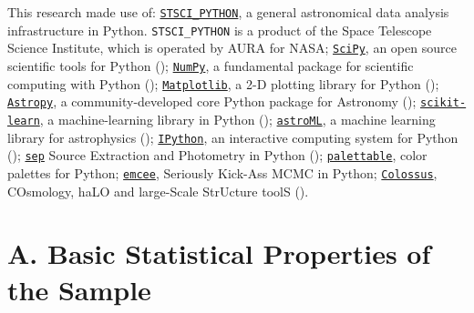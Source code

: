 \documentclass{emulateapj}
\begin{document}
\begin{CJK*}{UTF8}{gbsn}
  This research made use of:
  \href{http://www.stsci.edu/institute/software_hardware/pyraf/stsci\_python}{\texttt{STSCI\_PYTHON}},
      a general astronomical data analysis infrastructure in Python. 
      \texttt{STSCI\_PYTHON} is a product of the Space Telescope Science Institute, 
      which is operated by AURA for NASA;
  \href{http://www.scipy.org/}{\texttt{SciPy}},
      an open source scientific tools for Python (\citealt{SciPy});
  \href{http://www.numpy.org/}{\texttt{NumPy}}, 
      a fundamental package for scientific computing with Python (\citealt{NumPy});
  \href{http://matplotlib.org/}{\texttt{Matplotlib}}, 
      a 2-D plotting library for Python (\citealt{Matplotlib});
  \href{http://www.astropy.org/}{\texttt{Astropy}}, a community-developed 
      core Python package for Astronomy (\citealt{AstroPy}); 
  \href{http://scikit-learn.org/stable/index.html}{\texttt{scikit-learn}},
      a machine-learning library in Python (\citealt{scikit-learn}); 
  \href{http://www.astroml.org/}{\texttt{astroML}}, 
      a machine learning library for astrophysics (\citealt{astroML});
  \href{https://ipython.org}{\texttt{IPython}}, 
      an interactive computing system for Python (\citealt{IPython});
  \href{https://github.com/kbarbary/sep}{\texttt{sep}} 
      Source Extraction and Photometry in Python (\citealt{PythonSEP});
  \href{https://jiffyclub.github.io/palettable/}{\texttt{palettable}},
      color palettes for Python;
  \href{http://dan.iel.fm/emcee/current/}{\texttt{emcee}}, 
      Seriously Kick-Ass MCMC in Python;
  \href{http://bdiemer.bitbucket.org/}{\texttt{Colossus}}, 
      COsmology, haLO and large-Scale StrUcture toolS (\citealt{Colossus}).





\appendix


\section{A. Basic Statistical Properties of the Sample} 
	\label{app:sedasic} 
    

\end{CJK*}
\end{document}
